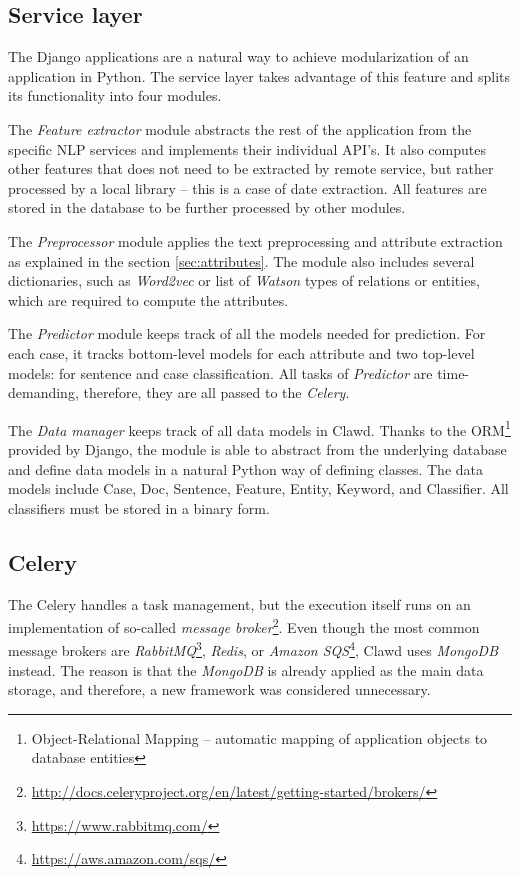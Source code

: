 \documentclass[
  digital, %
  notable,   %
  nolof,     %
  nolot,     %
  draft
]{fithesis3}
\begin{document}
\subsection{Service layer}
The Django applications are a natural way to achieve modularization of an application in Python.
The service layer takes advantage of this feature and splits its functionality into four modules.

The \textit{Feature extractor} module abstracts the rest of the application from the specific NLP services and implements their individual API's.
It also computes other features that does not need to be extracted by remote service, but rather processed by a local library -- this is a case of date extraction.
All features are stored in the database to be further processed by other modules.

The \textit{Preprocessor} module applies the text preprocessing and attribute extraction as explained in the section \ref{sec:attributes}.
The module also includes several dictionaries, such as \textit{Word2vec} or list of \textit{Watson} types of relations or entities, which are required to compute the attributes.

The \textit{Predictor} module keeps track of all the models needed for prediction.
For each case, it tracks bottom-level models for each attribute and two top-level models: for sentence and case classification.
All tasks of \textit{Predictor} are time-demanding, therefore, they are all passed to the \textit{Celery}.

The \textit{Data manager} keeps track of all data models in Clawd.
Thanks to the ORM\footnote{Object-Relational Mapping -- automatic mapping of application objects to database entities} provided by Django, the module is able to abstract from the underlying database and define data models in a natural Python way of defining classes.
The data models include Case, Doc, Sentence, Feature, Entity, Keyword, and Classifier.
All classifiers must be stored in a binary form.

\subsection{Celery}
The Celery handles a task management, but the execution itself runs on an implementation of so-called \textit{message broker}\footnote{\url{http://docs.celeryproject.org/en/latest/getting-started/brokers/}}.
Even though the most common message brokers are \textit{RabbitMQ}\footnote{\url{https://www.rabbitmq.com/}}, \textit{Redis}, or \textit{Amazon SQS}\footnote{\url{https://aws.amazon.com/sqs/}}, Clawd uses \textit{MongoDB} instead.
The reason is that the \textit{MongoDB} is already applied as the main data storage, and therefore, a new framework was considered unnecessary.
\end{document}
